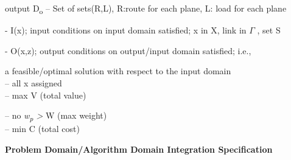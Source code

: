 \documentclass[12pt]{article}
\renewcommand{\_}{\kern-1.5pt\textunderscore\kern-1.5pt}
\begin{document}
\begin{adjustwidth}{0.64in}{0.0in}
\tab output D\textsubscript{o }– Set of sets(R,L), R:route for each plane, L: load for each plane\par

\end{adjustwidth}

\begin{adjustwidth}{0.64in}{0.0in}
- I(x); input conditions on input domain satisﬁed; x in X, link in $ \Gamma $ , set S \par

\end{adjustwidth}

\begin{adjustwidth}{0.64in}{0.0in}
- O(x,z); output conditions on output/input domain satisﬁed; i.e., \par

\end{adjustwidth}

\setlength{\parskip}{18.12pt}
\begin{adjustwidth}{0.64in}{0.0in}
\tab a feasible/optimal solution with respect to the input domain \\
-- all x assigned\\
-- max V (total value)\par

\end{adjustwidth}

\begin{adjustwidth}{0.64in}{0.0in}
-- no \textit{w\textsubscript{p} > }W (max weight)\\
-- min C (total cost)\  \par

\end{adjustwidth}

\setlength{\parskip}{8.04pt}
\begin{adjustwidth}{0.0in}{-0.11in}
\textbf{Problem Domain/Algorithm Domain Integration Specification\\
}\par

\end{adjustwidth}
\end{document}

